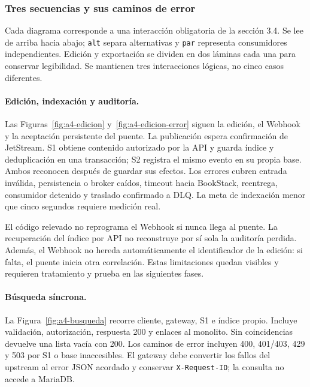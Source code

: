 \subsubsection{Tres secuencias y sus caminos de error}

Cada diagrama corresponde a una interacción obligatoria de la sección 3.4.
Se lee de arriba hacia abajo; \texttt{alt} separa alternativas y \texttt{par}
representa consumidores independientes. Edición y exportación se dividen
en dos láminas cada una para conservar legibilidad. Se mantienen tres
interacciones lógicas, no cinco casos diferentes.

\paragraph{Edición, indexación y auditoría.}
Las Figuras~\ref{fig:a4-edicion} y~\ref{fig:a4-edicion-error} siguen la edición,
el Webhook y la aceptación persistente del puente. La publicación espera
confirmación de JetStream. S1 obtiene contenido autorizado por la API y
guarda índice y deduplicación en una transacción; S2 registra el mismo evento
en su propia base. Ambos reconocen después de guardar sus efectos.
Los errores cubren entrada inválida, persistencia o broker caídos,
timeout hacia BookStack, reentrega, consumidor detenido y traslado confirmado
a DLQ. La meta de indexación menor que cinco segundos requiere medición real.

El código relevado no reprograma el Webhook si nunca llega al puente.
La recuperación del índice por API no reconstruye por sí sola la auditoría
perdida. Además, el Webhook no hereda automáticamente el identificador de la
edición: si falta, el puente inicia otra correlación. Estas limitaciones
quedan visibles y requieren tratamiento y prueba en las siguientes fases.

\paragraph{Búsqueda síncrona.}
La Figura~\ref{fig:a4-busqueda} recorre cliente, gateway, S1 e índice propio.
Incluye validación, autorización, respuesta 200 y enlaces al monolito.
Sin coincidencias devuelve una lista vacía con 200. Los caminos de error
incluyen 400, 401/403, 429 y 503 por S1 o base inaccesibles. El gateway debe
convertir los fallos del upstream al error JSON acordado y conservar
\texttt{X-Request-ID}; la consulta no accede a MariaDB.

